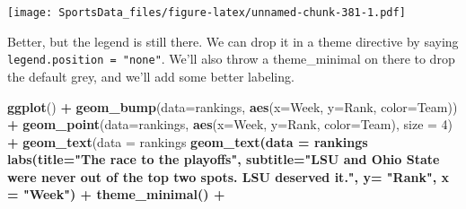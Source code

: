 \documentclass[
]{book}
\newenvironment{Shaded}{\begin{snugshade}}{\end{snugshade}}
\newcommand{\DataTypeTok}[1]{\textcolor[rgb]{0.13,0.29,0.53}{#1}}
\newcommand{\DecValTok}[1]{\textcolor[rgb]{0.00,0.00,0.81}{#1}}
\newcommand{\FloatTok}[1]{\textcolor[rgb]{0.00,0.00,0.81}{#1}}
\newcommand{\KeywordTok}[1]{\textcolor[rgb]{0.13,0.29,0.53}{\textbf{#1}}}
\newcommand{\NormalTok}[1]{#1}
\newcommand{\OperatorTok}[1]{\textcolor[rgb]{0.81,0.36,0.00}{\textbf{#1}}}
\newcommand{\StringTok}[1]{\textcolor[rgb]{0.31,0.60,0.02}{#1}}
\begin{document}
\texttt{[image: SportsData\_files/figure-latex/unnamed-chunk-381-1.pdf]}

Better, but the legend is still there. We can drop it in a theme directive by saying \texttt{legend.position\ =\ "none"}. We'll also throw a theme\_minimal on there to drop the default grey, and we'll add some better labeling.

\begin{Shaded}
\begin{Highlighting}[]
\KeywordTok{ggplot}\NormalTok{() }\OperatorTok{+}\StringTok{ }
\StringTok{  }\KeywordTok{geom_bump}\NormalTok{(}\DataTypeTok{data=}\NormalTok{rankings, }\KeywordTok{aes}\NormalTok{(}\DataTypeTok{x=}\NormalTok{Week, }\DataTypeTok{y=}\NormalTok{Rank, }\DataTypeTok{color=}\NormalTok{Team)) }\OperatorTok{+}\StringTok{ }
\StringTok{  }\KeywordTok{geom_point}\NormalTok{(}\DataTypeTok{data=}\NormalTok{rankings, }\KeywordTok{aes}\NormalTok{(}\DataTypeTok{x=}\NormalTok{Week, }\DataTypeTok{y=}\NormalTok{Rank, }\DataTypeTok{color=}\NormalTok{Team), }\DataTypeTok{size =} \DecValTok{4}\NormalTok{) }\OperatorTok{+}\StringTok{   }
\StringTok{  }\KeywordTok{geom_text}\NormalTok{(}\DataTypeTok{data =}\NormalTok{ rankings }\OperatorTok{%
\StringTok{  }\KeywordTok{geom_text}\NormalTok{(}\DataTypeTok{data =}\NormalTok{ rankings }\OperatorTok{%
\StringTok{  }\KeywordTok{labs}\NormalTok{(}\DataTypeTok{title=}\StringTok{"The race to the playoffs"}\NormalTok{, }\DataTypeTok{subtitle=}\StringTok{"LSU and Ohio State were never out of the top two spots. LSU deserved it."}\NormalTok{, }\DataTypeTok{y=} \StringTok{"Rank"}\NormalTok{, }\DataTypeTok{x =} \StringTok{"Week"}\NormalTok{) }\OperatorTok{+}
\StringTok{  }\KeywordTok{theme_minimal}\NormalTok{() }\OperatorTok{+}
}}
\end{Highlighting}
\end{Shaded}
\end{document}
